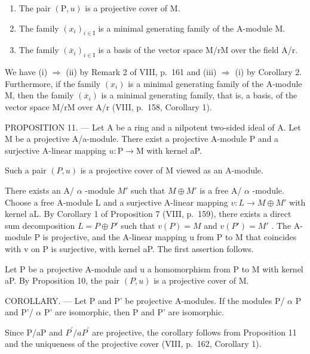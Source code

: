\begin{enumerate}
\def\labelenumi{(\roman{enumi})}
\item
  The pair \((\mathrm{P},u)\) is a projective cover of M.
\item
  The family \((x_{i})_{i\in \mathrm{I}}\) is a minimal generating family of the A-module M.
\item
  The family \((\overline{x}_{i})_{i\in\mathrm{I}}\) is a basis of the vector space M/rM over the field A/r.
\end{enumerate}

We have (i) \(\Rightarrow\) (ii) by Remark 2 of VIII, p.~161 and (iii) \(\Rightarrow\) (i) by Corollary 2. Furthermore, if the family \((x_{i})\) is a minimal generating family of the A-module M, then the family \((\overline{x}_{i})\) is a minimal generating family, that is, a basis, of the vector space M/rM over A/r (VIII, p.~158, Corollary 1).

PROPOSITION 11. --- Let A be a ring and a nilpotent two-sided ideal of A. Let M be a projective A/a-module. There exist a projective A-module P and a surjective A-linear mapping \(u: \mathrm{P} \to \mathrm{M}\) with kernel aP.

Such a pair \((P,u)\) is a projective cover of M viewed as an A-module.

There exists an A/ \(\alpha\) -module \(M'\) such that \(M \oplus M'\) is a free A/ \(\alpha\) -module. Choose a free A-module L and a surjective A-linear mapping \(v: L \to M \oplus M'\) with kernel aL. By Corollary 1 of Proposition 7 (VIII, p.~159), there exists a direct sum decomposition \(L = P \oplus P'\) such that \(v(P) = M\) and \(v(P') = M'\) . The A-module P is projective, and the A-linear mapping u from P to M that coincides with v on P is surjective, with kernel aP. The first assertion follows.

Let P be a projective A-module and u a homomorphism from P to M with kernel aP. By Proposition 10, the pair \((P,u)\) is a projective cover of M.

COROLLARY. --- Let P and P' be projective A-modules. If the modules P/ \(\alpha\) P and P'/ \(\alpha\) P' are isomorphic, then P and P' are isomorphic.

Since P/aP and \(P^{\prime}/aP^{\prime}\) are projective, the corollary follows from Proposition 11 and the uniqueness of the projective cover (VIII, p.~162, Corollary 1).

